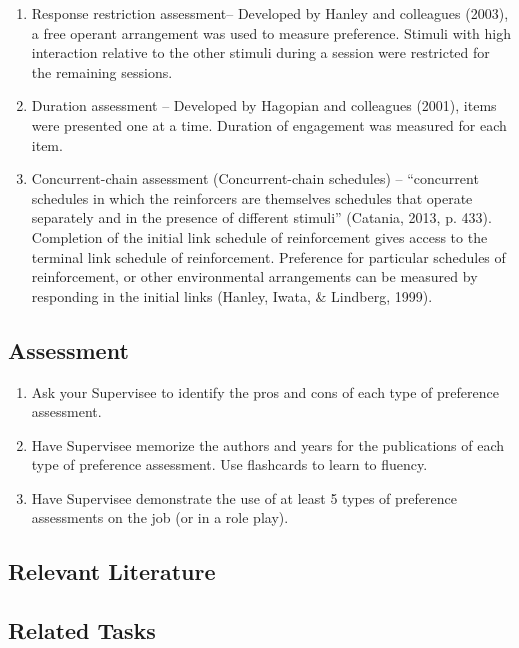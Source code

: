 \begin{enumerate}
\item Response restriction assessment– Developed by Hanley and colleagues (2003), a free operant arrangement was used to measure preference. Stimuli with high interaction relative to the other stimuli during a session were restricted for the remaining sessions.
\item Duration assessment – Developed by Hagopian and colleagues (2001), items were presented one at a time. Duration of engagement was measured for each item.
\item Concurrent-chain assessment (Concurrent-chain schedules) – ``concurrent schedules in which the reinforcers are themselves schedules that operate separately and in the presence of different stimuli'' (Catania, 2013, p. 433). Completion of the initial link schedule of reinforcement gives access to the terminal link schedule of reinforcement. Preference for particular schedules of reinforcement, or other environmental arrangements can be measured by responding in the initial links (Hanley, Iwata, \& Lindberg, 1999).
\end{enumerate}
% 
\subsection{Assessment}
\begin{enumerate}
\item Ask your Supervisee to identify the pros and cons of each type of preference assessment.
\item Have Supervisee memorize the authors and years for the publications of each type of preference assessment. Use flashcards to learn to fluency.
\item Have Supervisee demonstrate the use of at least 5 types of preference assessments on the job (or in a role play).
\end{enumerate}
%
\subsection{Relevant Literature}
\begin{refsection}
\nocite{cooper2007applied,
    catania2013learning,
    fisher1992comparison,
    hagopian2001evaluating,
    hanley2003response,
    hanley1999analysis,
    deleon1996evaluation,
    pace1985assessment,
    roane1998evaluation,
    smith1995effects,
    windsor1994preference}
\printbibliography[heading=none]
\end{refsection}
\subsection{Related Tasks} 
\fouriSeven{}\\
\fourjFour{}\\
%
%
%
%
%
